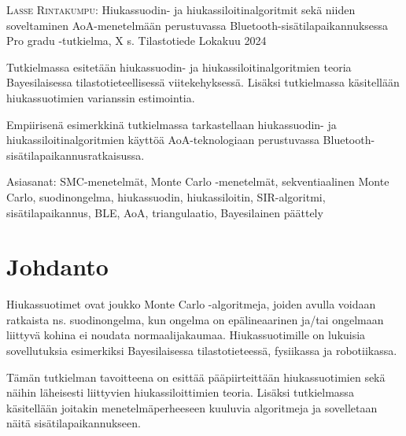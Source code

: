 \documentclass[
  12pt,
  a4paper, twoside]{book}
\newcommand{\tekija}{{Lasse Rintakumpu}}
\newcommand{\otsikko}{{Hiukassuodin- ja hiukassiloitinalgoritmit sekä niiden soveltaminen AoA-menetelmään perustuvassa Bluetooth-sisätilapaikannuksessa}}
\newcommand{\tutkielma}{{Pro gradu }}
\newcommand{\aika}{{Lokakuu 2024}}
\newcommand{\paaaine}{{Tilastotiede}}
\begin{document}
\noindent \textsc{\tekija}: \otsikko \newline
\tutkielma-tutkielma, X s. \newline
\paaaine \newline
\aika
\par\noindent{\rule{\textwidth}{.2mm}} \newline


\vspace{4mm}\noindent Tutkielmassa esitetään hiukassuodin- ja hiukassiloitinalgoritmien teoria Bayesilaisessa tilastotieteellisessä viitekehyksessä. Lisäksi tutkielmassa käsitellään hiukassuotimien varianssin estimointia.

\vspace{4mm}\noindent Empiirisenä esimerkkinä tutkielmassa tarkastellaan hiukassuodin- ja hiukassiloitinalgoritmien käyttöä AoA-teknologiaan perustuvassa Bluetooth-sisätilapaikannusratkaisussa.

\vspace{4mm}\noindent Asiasanat: SMC-menetelmät, Monte Carlo -menetelmät, sekventiaalinen Monte Carlo, suodinongelma, hiukassuodin, hiukassiloitin, SIR-algoritmi, sisätilapaikannus, BLE, AoA, triangulaatio, Bayesilainen päättely

\cleardoublepage

\cleardoublepage

\pagestyle{plain} 

{
\hypersetup{linkcolor=blue}
\setcounter{tocdepth}{2}
\tableofcontents
}
\setlength\parindent{24pt}
\setlength\parskip{3pt}

\chapter{Johdanto}

Hiukassuotimet ovat joukko Monte Carlo -algoritmeja, joiden avulla voidaan ratkaista ns. suodinongelma, kun ongelma on epälineaarinen ja/tai ongelmaan liittyvä kohina ei noudata normaalijakaumaa. Hiukassuotimille on lukuisia sovellutuksia esimerkiksi Bayesilaisessa tilastotieteessä, fysiikassa ja robotiikassa.

Tämän tutkielman tavoitteena on esittää pääpiirteittään hiukassuotimien sekä näihin läheisesti liittyvien hiukassiloittimien teoria. Lisäksi tutkielmassa käsitellään joitakin menetelmäperheeseen kuuluvia algoritmeja ja sovelletaan näitä sisätilapaikannukseen.
\end{document}
